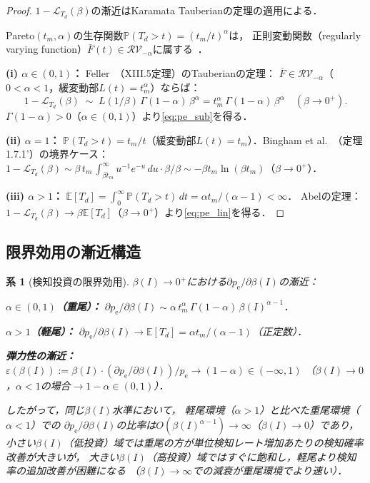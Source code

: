 \documentclass[12pt,a4paper]{article}
\theoremstyle{plain}
\newtheorem{corollary}[theorem]{系}
\theoremstyle{definition}
\theoremstyle{remark}
\newcommand{\E}{\mathbb{E}}
\newcommand{\Prob}{\mathbb{P}}
\newcommand{\calL}{\mathcal{L}}
\newcommand{\pe}{p_{\mathrm{e}}}
\newcommand{\betaI}{\beta(I)}
\begin{document}
\begin{proof}
$1-\calL_{T_d}(\beta)$の漸近はKaramata Tauberianの定理の適用による．

Pareto$(t_m,\alpha)$の生存関数$\Prob(T_d>t)=(t_m/t)^\alpha$は，
正則変動関数（regularly varying function）$\bar F(t)\in\mathcal{RV}_{-\alpha}$に属する~\cite{bingham1989}．

\textbf{(i) $\alpha\in(0,1)$：}
Feller~\cite{feller1971}（XIII.5定理）のTauberianの定理：
$\bar F\in\mathcal{RV}_{-\alpha}$（$0<\alpha<1$，緩変動部$L(t)=t_m^\alpha$）ならば：
\[
  1-\calL_{T_d}(\beta)\;\sim\;L(1/\beta)\,\Gamma(1-\alpha)\,\beta^\alpha
  = t_m^\alpha\,\Gamma(1-\alpha)\,\beta^\alpha\quad(\beta\to0^+).
\]
$\Gamma(1-\alpha)>0$（$\alpha\in(0,1)$）より\eqref{eq:pe_sub}を得る．

\textbf{(ii) $\alpha=1$：}
$\Prob(T_d>t)=t_m/t$（緩変動部$L(t)=t_m$）．Bingham et al.~\cite{bingham1989}（定理1.7.1'）の境界ケース：
$1-\calL_{T_d}(\beta)\sim\beta\,t_m\,\int_{\beta t_m}^\infty u^{-1}e^{-u}\,du
\cdot\beta/\beta\sim -\beta t_m\ln(\beta t_m)$（$\beta\to0^+$）．

\textbf{(iii) $\alpha>1$：}
$\E[T_d]=\int_0^\infty\Prob(T_d>t)\,dt=\alpha t_m/(\alpha-1)<\infty$．
Abelの定理：$1-\calL_{T_d}(\beta)\to\beta\E[T_d]$（$\beta\to0^+$）より\eqref{eq:pe_lin}を得る．
\end{proof}

\subsection{限界効用の漸近構造}

\begin{corollary}[検知投資の限界効用]\label{cor:diminishing}
$\betaI\to0^+$における$\partial\pe/\partial\betaI$の漸近：

\noindent\textbf{$\alpha\in(0,1)$（重尾）：}
$\partial\pe/\partial\betaI\sim\alpha\,t_m^\alpha\,\Gamma(1-\alpha)\,\betaI^{\alpha-1}$．

\noindent\textbf{$\alpha>1$（軽尾）：}
$\partial\pe/\partial\betaI\to\E[T_d]=\alpha t_m/(\alpha-1)$（正定数）．

\noindent\textbf{弾力性の漸近：}
$\varepsilon(\betaI):=\betaI\cdot(\partial\pe/\partial\betaI)/\pe\to(1-\alpha)\in(-\infty,1)$
（$\betaI\to0$，$\alpha<1$の場合$\to 1-\alpha\in(0,1)$）．

したがって，同じ$\betaI$水準において，
軽尾環境（$\alpha>1$）と比べた重尾環境（$\alpha<1$）での
$\partial\pe/\partial\betaI$の比率は$O(\betaI^{\alpha-1})\to\infty$（$\betaI\to0$）であり，
\emph{小さい$\betaI$（低投資）域では重尾の方が単位検知レート増加あたりの検知確率改善が大きいが，
大きい$\betaI$（高投資）域ではすぐに飽和し，軽尾より検知率の追加改善が困難になる}
（$\betaI\to\infty$での減衰が重尾環境でより速い）．
\end{corollary}
\end{document}
